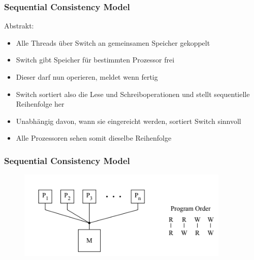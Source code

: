 \documentclass{sikslides}
\begin{document}
\begin{frame}
	\frametitle{Sequential Consistency Model}
Abstrakt:
	\begin{itemize}
		\item Alle Threads über Switch an gemeinsamen Speicher gekoppelt
\bigskip
		\item Switch gibt Speicher für bestimmten Prozessor frei
\bigskip
		\item Dieser darf nun operieren, meldet wenn fertig
\bigskip
		\item Switch sortiert also die Lese und Schreiboperationen und stellt sequentielle Reihenfolge her
\bigskip
		\item Unabhängig davon, wann sie eingereicht werden, sortiert Switch sinnvoll 
\bigskip
		\item Alle Prozessoren sehen somit dieselbe Reihenfolge
	\end{itemize}
\end{frame}


\begin{frame}
	\frametitle{Sequential Consistency Model}
\begin{figure}[htbp] 
  \centering
  \includegraphics[width=0.9\textwidth]{figures/seqq.PNG}
  \label{Fig:gpum}
\end{figure}
\end{frame}
\end{document}
